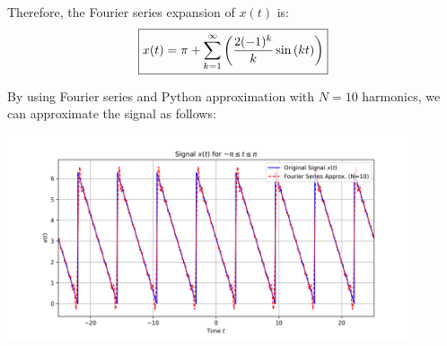 \documentclass[a4paper, 10pt]{article}
\begin{document}
\begin{tosubmit}
Therefore, the Fourier series expansion of \( x(t) \) is:
\[ \boxed{ x(t) = \pi + \sum_{k=1}^{\infty} \left( \frac{2(-1)^k}{k} \sin{(k t)} \right) } \]

\newpage

By using Fourier series and Python approximation with \( N = 10 \) harmonics, we can approximate the signal as follows:
\begin{center}
    \includegraphics[width=0.9\textwidth]{images/problem_2_2.png}
\end{center}
\end{tosubmit}
\end{document}
